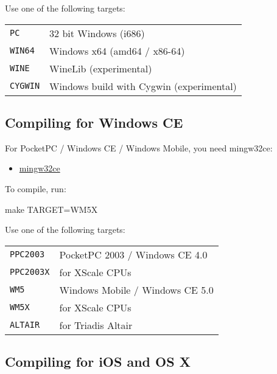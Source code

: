 Use one of the following targets:

\begin{tabular}{lp{8cm}}

\texttt{PC} & 32 bit Windows (i686) \\

\texttt{WIN64} & Windows x64 (amd64 / x86-64) \\

\texttt{WINE} & WineLib (experimental) \\

\texttt{CYGWIN} & Windows build with Cygwin (experimental) \\

\end{tabular}

\subsection{Compiling for Windows CE}

For PocketPC / Windows CE / Windows Mobile, you need mingw32ce:

\begin{itemize}
\item \href{http://max.kellermann.name/projects/cegcc/}{mingw32ce}
\end{itemize}

To compile, run:

\begin{verbatim*}
make TARGET=WM5X
\end{verbatim*}

Use one of the following targets:

\begin{tabular}{lp{8cm}}

\texttt{PPC2003} & PocketPC 2003 / Windows CE 4.0 \\

\texttt{PPC2003X} & for XScale CPUs \\

\texttt{WM5} & Windows Mobile / Windows CE 5.0 \\

\texttt{WM5X} & for XScale CPUs \\

\texttt{ALTAIR} & for Triadis Altair \\

\end{tabular}

\subsection{Compiling for iOS and OS X}


